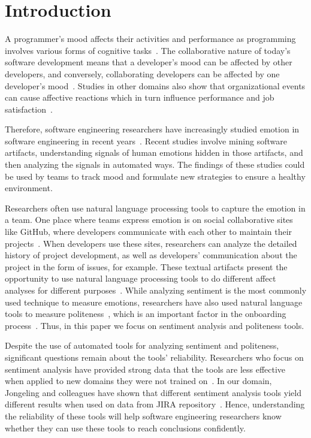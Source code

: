 \section{Introduction}

A programmer's mood affects their activities and performance as programming involves various forms of cognitive tasks~\cite{khan2011moods}. 
The collaborative nature of today's software development
means that a developer's mood can be affected by other
developers, and conversely, collaborating developers can be 
affected by one developer's 
mood~\cite{murgia2014developers,graziotin2014happy,curtis1988field}. 
Studies in other domains also show that organizational events can cause affective reactions which in turn influence performance and job satisfaction~\cite{parkinson1996changing}. 

Therefore, software engineering researchers have increasingly studied emotion in software engineering in recent years~\cite{jongeling2017negative}. 
Recent studies involve 
mining software artifacts, 
understanding signals of human emotions hidden in those artifacts, and 
then analyzing the signals in automated ways. 
The findings of these studies could be used by teams to 
track mood and formulate new strategies to ensure 
a healthy environment.


Researchers often use natural language processing tools to capture the emotion in a team.
One place where teams express emotion is on social collaborative sites
like GitHub, where
developers communicate with each other to maintain their projects~\cite{storey2010impact}. 
When developers use these sites, 
researchers can analyze the detailed history of project development, 
as well as developers' communication about the project in the form of issues, for example. 
These textual artifacts present the opportunity to use natural language 
processing tools to do different affect analyses for different purposes~\cite{ortu2015bullies}. 
While analyzing sentiment is the most commonly used technique to measure emotions, 
researchers have also used natural language tools to measure 
politeness~\cite{ortu2015bullies}, which is an important 
factor in the onboarding process~\cite{steinmacher2015social}.
Thus, in this paper we focus on sentiment analysis and 
politeness tools. 

Despite the use of automated tools for analyzing sentiment and 
politeness, significant questions remain about the tools' reliability.
Researchers who focus on sentiment analysis have provided strong data
that the tools are less effective when applied to new domains they 
were not trained on~\cite{novielli2015challenges,gamon2005pulse}. 
In our domain, Jongeling and colleagues have 
shown that different sentiment analysis tools yield different 
results when used on data from JIRA repository~\cite{jongeling2017negative}. 
Hence, understanding the reliability of these tools will help 
software engineering researchers know whether they can use these
tools to reach conclusions confidently.

